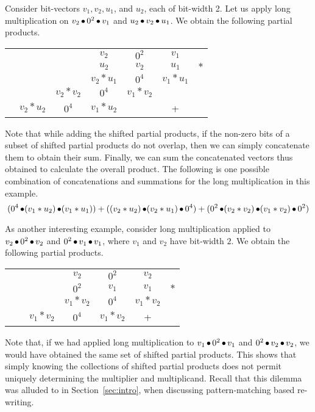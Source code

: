 \begin{example}
  Consider bit-vectors $v_1,v_2,u_1$, and $u_2$, each of bit-width 2.
  Let us apply long multiplication on
  $v_2 \mathop{\bullet} 0^2 \mathop{\bullet} v_1$ and $u_2 \mathop{\bullet} v_2 \mathop{\bullet} u_1$.
  We obtain the following partial products.
\begin{center}
  \vspace{-2ex}
\begin{tabular}{c@{\quad}c@{\quad}c@{\quad}c@{\quad}c@{\quad}c@{\quad}c}
  &&& $v_2$ & $0^2$ & $v_1$&\\ 
  &&& $u_2$ & $v_2$ & $u_1$&$*$\\ \hline
  &&&$v_2*u_1$& $0^4$ & $v_1*u_1$&\\
  &&$v_2*v_2$&$0^4$& $v_1*v_2$ && \\
  &$v_2*u_2$& $0^4$ &$v_1*u_2$&  & +&\\\hline
\end{tabular}
\end{center}
Note that while adding the shifted partial products, if the non-zero
bits of a subset of shifted partial products do not overlap, then we
can simply concatenate them to obtain their sum. Finally, we can sum
the concatenated vectors thus obtained to calculate the overall
product. The following is one possible combination of 
concatenations and summations for the long multiplication in this
example.
%
\vspace{-1ex}
$$
( 0^4 \concat (v_1*u_2) \concat (v_1*u_1)) +
((v_2*u_2) \concat (v_2*u_1) \concat 0^4) +
(0^2 \concat (v_2*v_2) \concat (v_1*v_2) \concat 0^2)
\vspace{-1ex}
$$
\end{example}

\begin{example}

  As another interesting example, consider long multiplication applied to 
  $v_2 \mathop{\bullet} 0^2 \mathop{\bullet} v_2$ and $0^2 \mathop{\bullet} v_1 \mathop{\bullet} v_1$, where
  $v_1$ and $v_2$ have bit-width $2$.
  We obtain the following partial products.
\begin{center}
\begin{tabular}{c@{\quad}c@{\quad}c@{\quad}c@{\quad}c@{\quad}c@{\quad}c}
  &&& $v_2$ & $0^2$ & $v_2$&\\ 
  &&& $0^2$ & $v_1$ & $v_1$&$*$\\ \hline
  &&&$v_1*v_2$& $0^4$ & $v_1*v_2$&\\
  &&$v_1*v_2$&$0^4$& $v_1*v_2$ &+&\\\hline
\end{tabular}
\end{center}
Note that, if we had applied long multiplication to $v_1 \mathop{\bullet} 0^2
\mathop{\bullet} v_1$ and $0^2 \mathop{\bullet} v_2 \mathop{\bullet} v_2$, we would have obtained
the same set of shifted partial products. This shows that simply
knowing the collections of shifted partial products does not permit
uniquely determining the multiplier and multiplicand. Recall that
this dilemma was alluded to in Section~\ref{sec:intro}, when discussing
pattern-matching based re-writing.

\end{example}



